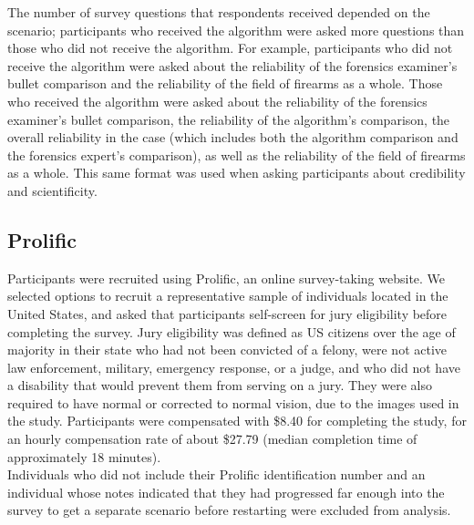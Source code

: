 \documentclass[print]{nuthesis}
\begin{document}
The number of survey questions that respondents received depended on the scenario; participants who received the algorithm were asked more questions than those who did not receive the algorithm.
For example, participants who did not receive the algorithm were asked about the reliability of the forensics examiner's bullet comparison and the reliability of the field of firearms as a whole.
Those who received the algorithm were asked about the reliability of the forensics examiner's bullet comparison, the reliability of the algorithm's comparison, the overall reliability in the case (which includes both the algorithm comparison and the forensics expert's comparison), as well as the reliability of the field of firearms as a whole.
This same format was used when asking participants about credibility and scientificity.

\hypertarget{prolific}{%
\subsection{Prolific}\label{prolific}}

Participants were recruited using Prolific, an online survey-taking website.
We selected options to recruit a representative sample of individuals located in the United States, and asked that participants self-screen for jury eligibility before completing the survey.
Jury eligibility was defined as US citizens over the age of majority in their state who had not been convicted of a felony, were not active law enforcement, military, emergency response, or a judge, and who did not have a disability that would prevent them from serving on a jury.
They were also required to have normal or corrected to normal vision, due to the images used in the study.
Participants were compensated with \$8.40 for completing the study, for an hourly compensation rate of about \$27.79 (median completion time of approximately 18 minutes).\\
Individuals who did not include their Prolific identification number and an individual whose notes indicated that they had progressed far enough into the survey to get a separate scenario before restarting were excluded from analysis.
\end{document}
